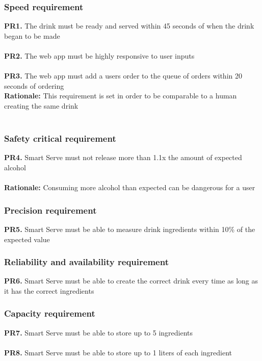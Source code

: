\documentclass{article}
\begin{document}
    \subsubsection{Speed requirement}
        \noindent\textbf{PR1.} The drink must be ready and served within 45 seconds of when the drink began to be made \\\\
        \textbf{PR2.} The web app must be highly responsive to user inputs \\\\
        \textbf{PR3.} The web app must add a users order to the queue of orders within 20 seconds of ordering \\
        \indent\textbf{Rationale:} This requirement is set in order to be comparable to a human creating the same drink\\\
    \subsubsection{Safety critical requirement}
        \noindent\textbf{PR4.} Smart Serve must not release more than 1.1x the amount of expected alcohol \\
        \\ \indent\textbf{Rationale:} Consuming more alcohol than expected can be dangerous for a user \\
    \subsubsection{Precision requirement}
        \noindent\textbf{PR5.} Smart Serve must be able to measure drink ingredients within 10\% of the expected value \\
    \subsubsection{Reliability and availability requirement}
        \noindent\textbf{PR6.} Smart Serve must be able to create the correct drink every time as long as it has the correct ingredients \\
    \subsubsection{Capacity requirement}
        \noindent\textbf{PR7.} Smart Serve must be able to store up to 5 ingredients \\\\
        \textbf{PR8.} Smart Serve must be able to store up to 1 liters of each ingredient \\
\end{document}

